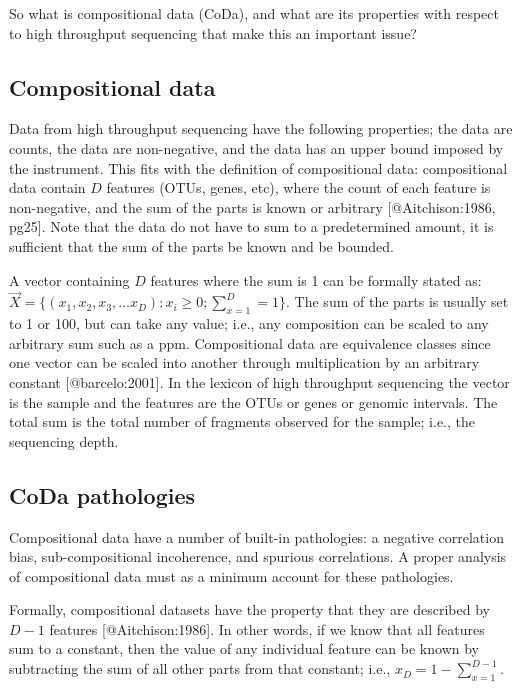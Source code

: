 \documentclass[
  onecolumn]{article}
\begin{document}
So what is compositional data (CoDa), and what are its properties with respect to high throughput sequencing that make this an important issue?

\hypertarget{compositional-data}{%
\subsection{Compositional data}\label{compositional-data}}

Data from high throughput sequencing have the following properties; the data are counts, the data are non-negative, and the data has an upper bound imposed by the instrument. This fits with the definition of compositional data: compositional data contain \(D\) features (OTUs, genes, etc), where the count of each feature is non-negative, and the sum of the parts is known or arbitrary {[}@Aitchison:1986, pg25{]}. Note that the data do not have to sum to a predetermined amount, it is sufficient that the sum of the parts be known and be bounded.

A vector containing \(D\) features where the sum is 1 can be formally stated as: \(\vec{X} = \{(x_1,x_2,x_3, \ldots x_D); x_i\ge 0; \sum_{x=1}^{D} = 1\}\). The sum of the parts is usually set to 1 or 100, but can take any value; i.e., any composition can be scaled to any arbitrary sum such as a ppm. Compositional data are equivalence classes since one vector can be scaled into another through multiplication by an arbitrary constant {[}@barcelo:2001{]}. In the lexicon of high throughput sequencing the vector is the sample and the features are the OTUs or genes or genomic intervals. The total sum is the total number of fragments observed for the sample; i.e., the sequencing depth.

\hypertarget{coda-pathologies}{%
\subsection{CoDa pathologies}\label{coda-pathologies}}

Compositional data have a number of built-in pathologies: a negative correlation bias, sub-compositional incoherence, and spurious correlations. A proper analysis of compositional data must as a minimum account for these pathologies.

Formally, compositional datasets have the property that they are described by \(D-1\) features {[}@Aitchison:1986{]}. In other words, if we know that all features sum to a constant, then the value of any individual feature can be known by subtracting the sum of all other parts from that constant; i.e., \(x_D = 1-\sum_{x=1}^{D-1}\).
\end{document}
